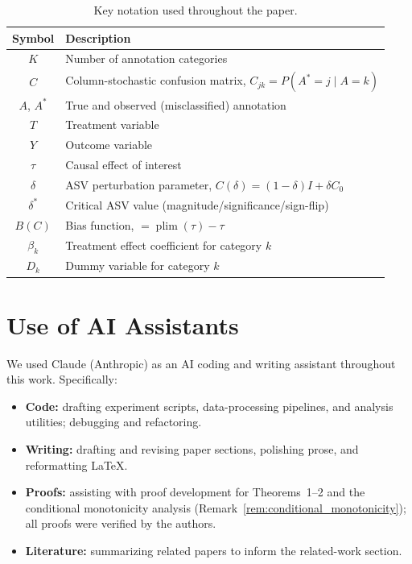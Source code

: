 \begin{table}[h]
\centering
\small
\caption{Key notation used throughout the paper.}
\label{tab:notation}
\begin{tabular}{cl}
\toprule
\textbf{Symbol} & \textbf{Description} \\
\midrule
$K$ & Number of annotation categories \\
$C$ & Column-stochastic confusion matrix, $C_{jk} = P(A^*{=}j \mid A{=}k)$ \\
$A$, $A^*$ & True and observed (misclassified) annotation \\
$T$ & Treatment variable \\
$Y$ & Outcome variable \\
$\tau$ & Causal effect of interest \\
$\delta$ & ASV perturbation parameter, $C(\delta) = (1{-}\delta)I + \delta C_0$ \\
$\delta^*$ & Critical ASV value (magnitude/significance/sign-flip) \\
$B(C)$ & Bias function, $= \operatorname{plim}(\hat{\tau}) - \tau$ \\
$\beta_k$ & Treatment effect coefficient for category $k$ \\
$D_k$ & Dummy variable for category $k$ \\
\bottomrule
\end{tabular}
\end{table}

\section{Use of AI Assistants}
\label{app:ai-assistants}

We used Claude (Anthropic) as an AI coding and writing assistant throughout this work. Specifically:
\begin{itemize}
    \item \textbf{Code:} drafting experiment scripts, data-processing pipelines, and analysis utilities; debugging and refactoring.
    \item \textbf{Writing:} drafting and revising paper sections, polishing prose, and reformatting \LaTeX{}.
    \item \textbf{Proofs:} assisting with proof development for Theorems~1--2 and the conditional monotonicity analysis (Remark~\ref{rem:conditional_monotonicity}); all proofs were verified by the authors.
    \item \textbf{Literature:} summarizing related papers to inform the related-work section.
\end{itemize}
